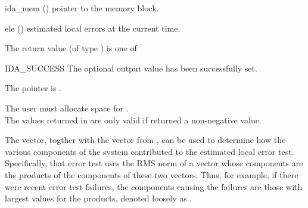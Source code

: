 {{\begin{args}
  \item[ida\_mem] ()
    pointer to the {\idas} memory block.
  \item[ele] ()
    estimated local errors at the current time.
  \end{args}
}
{
  The return value  (of type ) is one of
  \begin{args}
  \item[IDA\_SUCCESS]
    The optional output value has been successfully set.
  \item[\Id{IDA\_MEM\_NULL}]
    The  pointer is .
  \end{args}
}
{
  {\warn}The user must allocate space for . \\
  The values returned in  are only valid if
   returned a non-negative value.

  The  vector, togther with the  vector from
  , can be used to determine how the various
  components of the system contributed to the estimated local error
  test.  Specifically, that error test uses the RMS norm of a vector
  whose components are the products of the components of these two vectors.
  Thus, for example, if there were recent error test failures, the components
  causing the failures are those with largest values for the products,
  denoted loosely as .

}}
